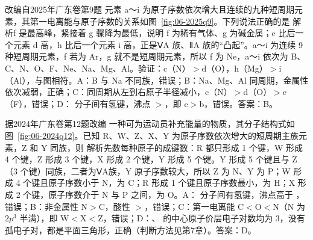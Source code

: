 \begin{zhenti}{改编自2025年广东卷第9题}
元素 a～i 为原子序数依次增大且连续的九种短周期元素，其第一电离能与原子序数的关系如图~\ref{fig:06-2025q9}。下列说法正确的是
{\heiti 解析\quad}f 是最高峰，紧接着 g 骤降为最低，说明 f 为稀有气体、g 为碱金属；c 比后一个元素 d 高，h 比后一个元素 i 高，正是ⅤA 族、ⅡA 族的“凸起”。a～i 为连续 9 种短周期元素，f 若为 Ar，g 就不是短周期元素，所以 f 为 Ne，a～i 依次为 B、C、N、O、F、Ne、Na、Mg、Al。验证：c（N）$>$d（O），h（Mg）$>$i（Al），与图相符。A：B 与 Na 不同族，错误；B：Na、Mg、Al 同周期，金属性依次减弱，正确；C：同周期从左到右原子半径减小，c（N）$>$d（O）$>$e（F），错误；D： 分子间有氢键，沸点 $>$，即 c$>$b，错误。答案：B。
\end{zhenti}

\begin{zhenti}{据2024年广东卷第12题改编}
一种可为运动员补充能量的物质，其分子结构式如图~\ref{fig:06-2024q12}。已知 R、W、Z、X、Y 为原子序数依次增大的短周期主族元素，Z 和 Y 同族，则
{\heiti 解析\quad}先数每种原子的成键数：R 都只形成 1 个键，W 形成 4 个键，Z 形成 3 个键，X 形成 2 个键，Y 形成 5 个键。Y 形成 5 个键且与 Z（3 个键）同族，二者为ⅤA族，Y 原子序数较大，所以 Z 为 N、Y 为 P；W 形成 4 个键且原子序数小于 N，为 C；R 形成 1 个键且原子序数最小，为 H；X 形成 2 个键，原子序数介于 N 与 P 之间，为 O。A： 分子间有氢键，沸点高于 ，错误；B：非金属性 N$>$C，酸性 $>$，错误；C：第一电离能 C$<$O$<$N（N 为 $2p^3$ 半满），即 W$<$X$<$Z，错误；D：、 的中心原子价层电子对数均为 3，没有孤电子对，都是平面三角形，正确（判断方法见第7章）。答案：D。
\end{zhenti}

